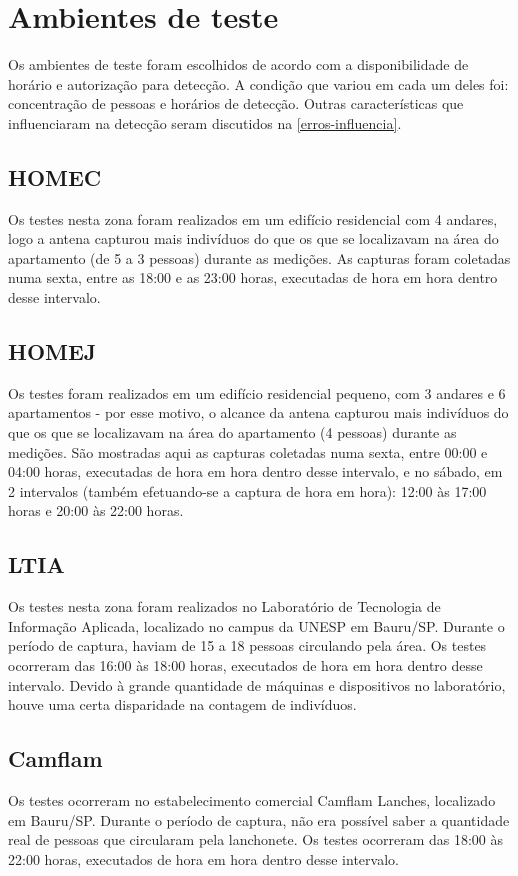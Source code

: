 \section{Ambientes de teste}
Os ambientes de teste foram escolhidos de acordo com a disponibilidade de horário e autorização
para detecção. A condição que variou em cada um deles foi: concentração de pessoas e horários de detecção.
Outras características que influenciaram na detecção seram discutidos na \autoref{erros-influencia}.

\subsection{HOMEC}

Os testes nesta zona foram realizados em um edifício residencial com 4
andares, logo a antena capturou mais indivíduos do que os que se localizavam na área do apartamento (de  5 a 3 pessoas) durante as medições. As capturas foram coletadas numa sexta, entre
as 18:00 e as 23:00 horas, executadas de hora em hora dentro desse intervalo.

\subsection{HOMEJ}
Os testes foram realizados em um edifício residencial pequeno, com 3
andares e 6 apartamentos - por esse motivo, o alcance da antena capturou mais
indivíduos do que os que se localizavam na área do apartamento (4 pessoas)
durante as medições. São mostradas aqui as capturas coletadas numa sexta, entre
00:00 e 04:00 horas, executadas de hora em hora dentro desse intervalo, e no
sábado, em 2 intervalos (também efetuando-se a captura de hora em hora): 12:00
às 17:00 horas e 20:00 às 22:00 horas.

\subsection{LTIA}
Os testes nesta zona foram realizados no Laboratório de Tecnologia de Informação Aplicada, localizado no campus da UNESP em Bauru/SP. Durante o período de captura, haviam de 15 a 18 pessoas circulando pela área.  Os testes ocorreram das 16:00 às 18:00 horas, executados de hora em hora dentro desse intervalo. Devido à grande quantidade de máquinas e dispositivos no laboratório, houve uma certa disparidade na contagem de indivíduos.

\subsection{Camflam}
Os testes ocorreram no estabelecimento comercial Camflam Lanches, localizado em Bauru/SP. Durante o período de captura, não era possível saber a quantidade real de pessoas que circularam pela lanchonete.  Os testes ocorreram das 18:00 às 22:00 horas, executados de hora em hora dentro desse intervalo. 

